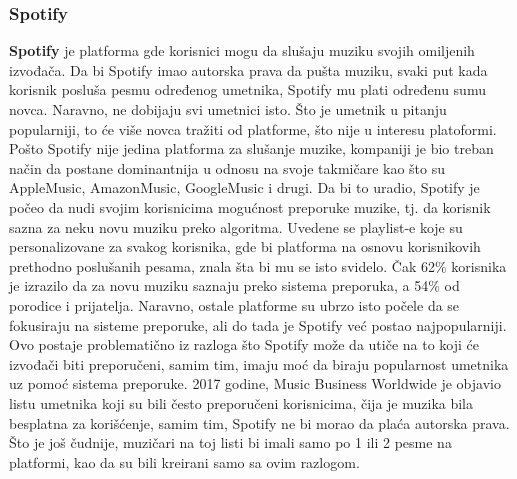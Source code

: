 \documentclass[a4paper]{article}
\begin{document}
\subsubsection{Spotify}
\textbf{Spotify} je platforma gde korisnici mogu da slušaju muziku svojih omiljenih izvođača.  Da bi Spotify imao autorska prava da pušta muziku, svaki put kada korisnik posluša pesmu određenog umetnika, Spotify mu plati određenu sumu novca. Naravno, ne dobijaju svi umetnici isto. Što je umetnik u pitanju popularniji, to će više novca tražiti od platforme, što nije u interesu platoformi. 
\newline
Pošto Spotify nije jedina platforma za slušanje muzike, kompaniji je bio treban način da postane dominantnija u odnosu na svoje takmičare kao što su AppleMusic, AmazonMusic, GoogleMusic i drugi. Da bi to uradio, Spotify je počeo da nudi svojim korisnicima mogućnost preporuke muzike, tj. da korisnik sazna za neku novu muziku preko algoritma. Uvedene se playlist-e koje su personalizovane za svakog korisnika, gde bi platforma na osnovu korisnikovih prethodno poslušanih pesama, znala šta bi mu se isto svidelo. 
Čak 62\% korisnika  je izrazilo da za novu muziku saznaju preko sistema preporuka, a 54\% od porodice i prijatelja. Naravno, ostale platforme su ubrzo isto počele da se fokusiraju na sisteme preporuke, ali do tada je Spotify već postao najpopularniji. 
\newline
Ovo postaje problematično iz razloga što Spotify može da utiče na to koji će izvođači biti preporučeni, samim tim, imaju moć da biraju popularnost umetnika uz pomoć sistema preporuke. 2017 godine, Music Business Worldwide je objavio listu umetnika koji su bili često preporučeni korisnicima, čija je muzika bila besplatna za korišćenje, samim tim, Spotify ne bi morao da plaća autorska prava. Što je još čudnije, muzičari na toj listi bi imali samo po 1 ili 2 pesme na platformi, kao da su bili kreirani samo sa ovim razlogom. \cite{spotify}

 
\end{document}
